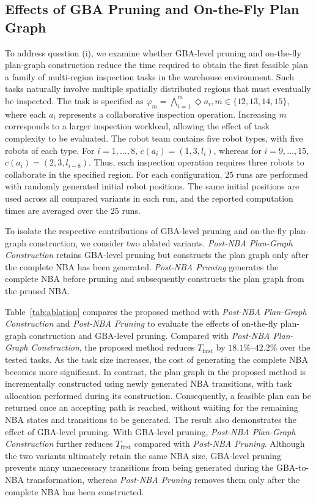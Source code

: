 \documentclass[lettersize,journal]{IEEEtran}
\theoremstyle{italiclemma}
\theoremstyle{italiclemma}
\theoremstyle{definition}
\begin{document}
\subsection{Effects of GBA Pruning and On-the-Fly Plan Graph} \label{sec:ablation}
To address question (i), we examine whether GBA-level pruning and on-the-fly plan-graph construction reduce the time required to obtain the first feasible plan a family of multi-region inspection tasks in the warehouse
environment. Such tasks naturally involve multiple spatially distributed regions that must eventually be inspected\cite{inbook}.  The task is specified as $\varphi_m=\bigwedge_{i=1}^{m}\Diamond a_i, m\in\{12,13,14,15\}$, where each $a_i$ represents a collaborative inspection operation. Increasing $m$ corresponds to a larger inspection workload, allowing the effect of task
complexity to be evaluated. The robot team contains five robot types, with five robots of each type. For $i=1,\ldots,8$, $c(a_i)=(1,3,l_i)$, whereas for $i=9,\ldots,15$, $c(a_i)=(2,3,l_{i-8})$. Thus, each inspection
operation requires three robots to collaborate in the specified region. For each configuration, 25 runs are performed with randomly generated initial robot positions. The same initial positions are used across all compared variants in each run, and the reported computation times are averaged over the 25 runs.

To isolate the respective contributions of GBA-level pruning and on-the-fly plan-graph construction, we consider two ablated variants. \emph{Post-NBA Plan-Graph Construction} retains GBA-level pruning but constructs the plan graph only after the complete NBA has been generated.  \emph{Post-NBA Pruning} generates the complete NBA before pruning and subsequently constructs the plan graph from the pruned NBA.

Table~\ref{tab:ablation} compares the proposed method with
\emph{Post-NBA Plan-Graph Construction} and \emph{Post-NBA Pruning} to evaluate the effects of on-the-fly plan-graph construction and GBA-level pruning. Compared with \emph{Post-NBA Plan-Graph Construction}, the proposed method reduces $T_{\mathrm{first}}$ by $18.1\%$--$42.2\%$ over the tested tasks.  As the task size increases, the cost of generating the complete NBA becomes more significant. In contrast, the plan graph in the proposed method is incrementally constructed using newly generated NBA transitions, with task allocation performed during its construction. Consequently, a feasible plan can be returned once an accepting path is reached, without waiting for the remaining NBA states and transitions to be generated. The result also demonstrates the effect of GBA-level pruning.  With GBA-level pruning, \emph{Post-NBA Plan-Graph Construction} further reduces $T_{\mathrm{first}}$ compared with \emph{Post-NBA Pruning}. Although the two variants ultimately retain the same NBA size,
GBA-level pruning prevents many unnecessary transitions from being generated during the GBA-to-NBA transformation, whereas \emph{Post-NBA Pruning} removes them only after the complete NBA has been constructed.
\end{document}
